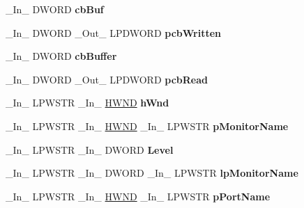 \begin{DoxyCompactItemize}
\mbox{\label{struct___m_o_n_i_t_o_r2_a486566a125f5ff8efb063f8591b38865}} 
\+\_\+\+In\+\_\+ D\+W\+O\+RD {\bfseries cb\+Buf}
\item 
\mbox{\label{struct___m_o_n_i_t_o_r2_ad546a1db479a6c162ca731dc1ebc1576}} 
\+\_\+\+In\+\_\+ D\+W\+O\+RD \+\_\+\+Out\+\_\+ L\+P\+D\+W\+O\+RD {\bfseries pcb\+Written}
\item 
\mbox{\label{struct___m_o_n_i_t_o_r2_a1d8f8cfe7d453bab33fcd55cd902100c}} 
\+\_\+\+In\+\_\+ D\+W\+O\+RD {\bfseries cb\+Buffer}
\item 
\mbox{\label{struct___m_o_n_i_t_o_r2_a38450c919f9ee8b121cbec87eac2fb01}} 
\+\_\+\+In\+\_\+ D\+W\+O\+RD \+\_\+\+Out\+\_\+ L\+P\+D\+W\+O\+RD {\bfseries pcb\+Read}
\item 
\mbox{\label{struct___m_o_n_i_t_o_r2_a1f38ae8948ebe933047ef2ea897c7055}} 
\+\_\+\+In\+\_\+ L\+P\+W\+S\+TR \+\_\+\+In\+\_\+ \hyperlink{interfacevoid}{H\+W\+ND} {\bfseries h\+Wnd}
\item 
\mbox{\label{struct___m_o_n_i_t_o_r2_ad3f7e080f179d2ff694e7c5db22efced}} 
\+\_\+\+In\+\_\+ L\+P\+W\+S\+TR \+\_\+\+In\+\_\+ \hyperlink{interfacevoid}{H\+W\+ND} \+\_\+\+In\+\_\+ L\+P\+W\+S\+TR {\bfseries p\+Monitor\+Name}
\item 
\mbox{\label{struct___m_o_n_i_t_o_r2_aa72e385b095d35493523e4ae82924406}} 
\+\_\+\+In\+\_\+ L\+P\+W\+S\+TR \+\_\+\+In\+\_\+ D\+W\+O\+RD {\bfseries Level}
\item 
\mbox{\label{struct___m_o_n_i_t_o_r2_ae8b0de78ae853963823e945d69ff3cde}} 
\+\_\+\+In\+\_\+ L\+P\+W\+S\+TR \+\_\+\+In\+\_\+ D\+W\+O\+RD \+\_\+\+In\+\_\+ L\+P\+W\+S\+TR {\bfseries lp\+Monitor\+Name}
\item 
\mbox{\label{struct___m_o_n_i_t_o_r2_a6dc83b4220281a7ebcaa5958b841c186}} 
\+\_\+\+In\+\_\+ L\+P\+W\+S\+TR \+\_\+\+In\+\_\+ \hyperlink{interfacevoid}{H\+W\+ND} \+\_\+\+In\+\_\+ L\+P\+W\+S\+TR {\bfseries p\+Port\+Name}
\item 

\end{DoxyCompactItemize}
